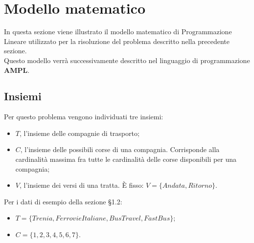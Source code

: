\documentclass[main.tex]{subfiles}
\begin{document}
\section{Modello matematico}
In questa sezione viene illustrato il modello matematico di Programmazione Lineare utilizzato per la risoluzione del problema descritto nella precedente sezione.\\
Questo modello verrà successivamente descritto nel linguaggio di programmazione \textbf{AMPL}.

\subsection*{Insiemi}
Per questo problema vengono individuati tre insiemi:
\begin{itemize}
    \item $T$, l'insieme delle compagnie di trasporto;
    \item $C$, l'insieme delle possibili corse di una compagnia. Corrisponde alla cardinalità massima fra tutte le cardinalità delle corse disponibili per una compagnia;
    \item $V$, l'insieme dei versi di una tratta. È fisso: $V = \{Andata, Ritorno \}$.
\end{itemize}
Per i dati di esempio della sezione §1.2:
\begin{itemize}
    \item $T = \{Trenia, FerrovieItaliane, BusTravel, FastBus\}$;
    \item $C = \{1, 2, 3, 4, 5, 6, 7\}$.
\end{itemize}
\end{document}
